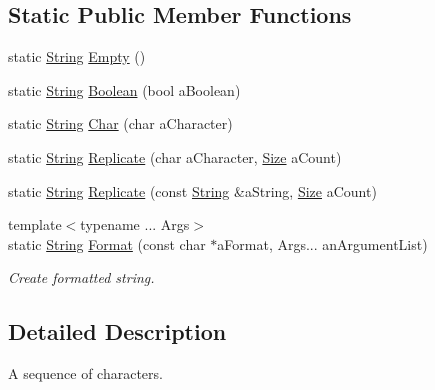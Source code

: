 \subsection*{Static Public Member Functions}
\begin{DoxyCompactItemize}
\item 
static \mbox{\hyperlink{classlibrary_1_1core_1_1types_1_1_string}{String}} \mbox{\hyperlink{classlibrary_1_1core_1_1types_1_1_string_a4d359cb0dba46e14ca46f90e728c2b96}{Empty}} ()
\item 
static \mbox{\hyperlink{classlibrary_1_1core_1_1types_1_1_string}{String}} \mbox{\hyperlink{classlibrary_1_1core_1_1types_1_1_string_afd43951e5c53b89428dc36db99a83842}{Boolean}} (bool a\+Boolean)
\item 
static \mbox{\hyperlink{classlibrary_1_1core_1_1types_1_1_string}{String}} \mbox{\hyperlink{classlibrary_1_1core_1_1types_1_1_string_abbc5a795da1a72d1456ba4950e62602c}{Char}} (char a\+Character)
\item 
static \mbox{\hyperlink{classlibrary_1_1core_1_1types_1_1_string}{String}} \mbox{\hyperlink{classlibrary_1_1core_1_1types_1_1_string_ab476d0986c7d364261ee3e668890836c}{Replicate}} (char a\+Character, \mbox{\hyperlink{namespacelibrary_1_1core_1_1types_a701626ea1027888ebbb8cfd0ff7adab0}{Size}} a\+Count)
\item 
static \mbox{\hyperlink{classlibrary_1_1core_1_1types_1_1_string}{String}} \mbox{\hyperlink{classlibrary_1_1core_1_1types_1_1_string_a85504c430c0fdc58393f819205fedd49}{Replicate}} (const \mbox{\hyperlink{classlibrary_1_1core_1_1types_1_1_string}{String}} \&a\+String, \mbox{\hyperlink{namespacelibrary_1_1core_1_1types_a701626ea1027888ebbb8cfd0ff7adab0}{Size}} a\+Count)
\item 
{\footnotesize template$<$typename ... Args$>$ }\\static \mbox{\hyperlink{classlibrary_1_1core_1_1types_1_1_string}{String}} \mbox{\hyperlink{classlibrary_1_1core_1_1types_1_1_string_ae1745f54be6952d7b5a388239377b287}{Format}} (const char $\ast$a\+Format, Args... an\+Argument\+List)
\begin{DoxyCompactList}\small\item\em Create formatted string. \end{DoxyCompactList}\end{DoxyCompactItemize}


\subsection{Detailed Description}
A sequence of characters. 

